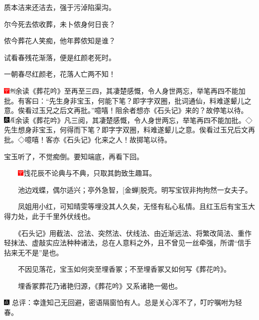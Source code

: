 质本洁来还洁去，强于污淖陷渠沟。

尔今死去侬收葬，未卜侬身何日丧？

侬今葬花人笑痴，他年葬侬知是谁？

试看春残花渐落，便是红颜老死时。

一朝春尽红颜老，花落人亡两不知！

{{\includegraphics[width=3mm]{../Images/00002}\includegraphics[width=3mm]{../Images/00011}\footnotesize \kaishu 余读《葬花吟》至再至三四，其凄楚感慨，令人身世两忘，举笔再四不能加批。有客曰：``先生身非宝玉，何能下笔？即字字双圈，批词通仙，料难遂颦儿之意。俟看过玉兄之后文再批。''噫嘻！阻余者想亦《石头记》来的？故停笔以待。　\includegraphics[width=3mm]{../Images/00004}\includegraphics[width=3mm]{../Images/00010}\footnotesize \kaishu 余读《葬花吟》凡三阅，其凄楚感慨，令人身世两忘，举笔再四不能加批。◇先生想身非宝玉，何得而下笔？即字字双圈，料难遂颦儿之意。俟看过玉兄后文再批。◇噫嘻！客亦《石头记》化来之人！故掷笔以待。}}

宝玉听了，不觉痴倒。要知端底，再看下回。

{　　\includegraphics[width=3mm]{../Images/00002}饯花辰不论典与不典，只取其韵致生趣耳。}

{　　池边戏蝶，偶尔适兴；亭外急智，{[}金蝉{]}脱壳。明写宝钗非拘拘然一女夫子。}

{　　凤姐用小红，可知晴雯等埋没其人久矣，无怪有私心私情。且红玉后有宝玉大得力处，此于千里外伏线也。}

{　　《石头记》用截法、岔法、突然法、伏线法、由近渐远法、将繁改简法、重作轻抹法、虚敲实应法种种诸法，总在人意料之外，且不曾见一丝牵强，所谓``信手拈来无不是''是也。}

{　　不因见落花，宝玉如何突至埋香冢；不至埋香冢又如何写《葬花吟》。}

{　　埋香冢葬花乃诸艳归源，《葬花吟》又系诸艳一偈也。}

{\includegraphics[width=3mm]{../Images/00005}  \kaishu 总评：幸逢知己无回避，密语隔窗怕有人。总是关心浑不了，叮咛嘱咐为轻春。}

